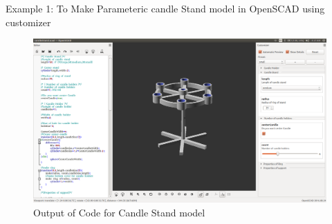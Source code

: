 Example 1: 
To Make Parameteric candle Stand model in OpenSCAD using customizer

\begin{figure}[H] 
	\centering \includegraphics[scale=0.31]{images/output/9.png}
	\caption{Output of Code for Candle Stand model}
\end{figure}

